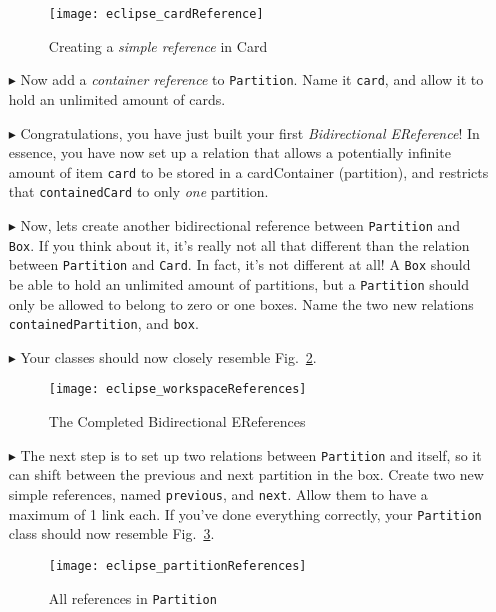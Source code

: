 \begin{itemize}
\begin{figure}[htbp]
	\centering
  \texttt{[image: eclipse\_cardReference]}
	\caption{Creating a \emph{simple reference} in Card}
	\label{fig:cardReference}
\end{figure} 

\item[$\blacktriangleright$] Now add a \emph{container reference} to \texttt{Partition}. Name it \texttt{card}, and allow it to hold an unlimited amount of
cards.

\item[$\blacktriangleright$] Congratulations, you have just built your first \emph{Bidirectional EReference}! In essence, you have now set up a relation that
allows a potentially infinite amount of item \texttt{card} to be stored in a cardContainer (partition), and restricts that \texttt{containedCard} to only
\emph{one} partition.

\item[$\blacktriangleright$] Now, lets create another bidirectional reference between \texttt{Partition} and \texttt{Box}. If you think about it, it's really
not all that different than the relation between \texttt{Partition} and \texttt{Card}. In fact, it's not different at all! A \texttt{Box} should be able to hold
an unlimited amount of partitions, but a \texttt{Partition} should only be allowed to belong to zero or one boxes. Name the two new relations
\texttt{containedPartition}, and \texttt{box}.

\item[$\blacktriangleright$] Your classes should now closely resemble Fig.~\ref{fig:allReferences}.


\begin{figure}[htbp]
	\centering
  \texttt{[image: eclipse\_workspaceReferences]}
	\caption{The Completed Bidirectional EReferences}
	\label{fig:allReferences}
\end{figure} 


\item[$\blacktriangleright$] The next step is to set up two relations between \texttt{Partition} and itself, so it can shift between the previous and next
partition in the box. Create two new simple references, named \texttt{previous}, and \texttt{next}. Allow them to have a maximum of 1 link each. If you've done
everything correctly, your \texttt{Partition} class should now resemble Fig.~\ref{fig:partitionReferences}.

\begin{figure}[htbp]
	\centering
  \texttt{[image: eclipse\_partitionReferences]}
	\caption{All references in \texttt{Partition}}
	\label{fig:partitionReferences}
\end{figure} 


\end{itemize}
